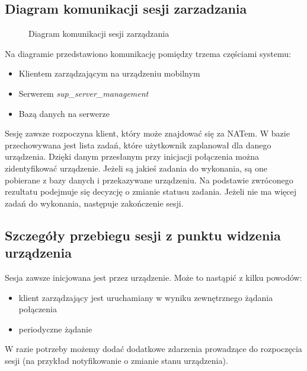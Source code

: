 \documentclass[polish,12pt]{aghthesis}
\begin{document}
\subsection{Diagram komunikacji sesji zarzadzania}
  \begin{figure}[htbp]
    \centering
        \caption{Diagram komunikacji sesji zarządzania}
  \end{figure}

Na diagramie przedstawiono komunikację pomiędzy trzema częściami systemu:
\begin{itemize}
\item Klientem zarządzającym na urządzeniu mobilnym
\item Serwerem \emph{sup\_server\_management}
\item Bazą danych na serwerze
\end{itemize}

Sesję zawsze rozpoczyna klient, który może znajdować się za NATem. W bazie przechowywana jest lista zadań, które użytkownik zaplanował dla danego urządzenia. Dzięki danym przesłanym przy inicjacji połączenia można zidentyfikować urządzenie. Jeżeli są jakieś zadania do wykonania, są one pobierane z bazy danych i przekazywane urządzeniu. Na podstawie zwróconego rezultatu podejmuje się decyzcję o zmianie statusu zadania.
Jeżeli nie ma więcej zadań do wykonania, następuje zakończenie sesji.

\subsection{Szczegóły przebiegu sesji z punktu widzenia urządzenia}
Sesja zawsze inicjowana jest przez urządzenie. Może to nastąpić z kilku powodów:
\begin{itemize}
\item klient zarządzający jest uruchamiany w wyniku zewnętrznego żądania połączenia
\item periodyczne żądanie
\end{itemize}
W razie potrzeby możemy dodać dodatkowe zdarzenia prowadzące do rozpoczęcia sesji (na przykład notyfikowanie o zmianie stanu urządzenia).
\end{document}
